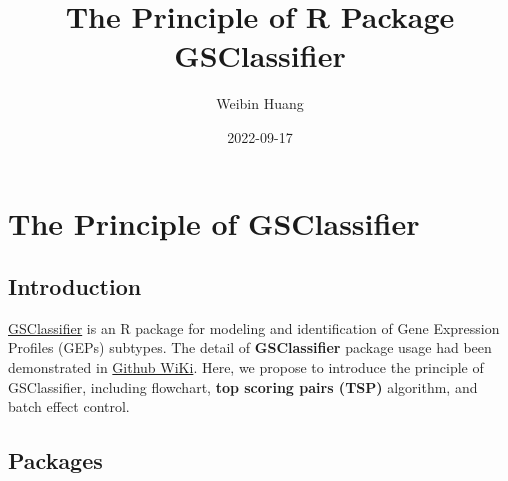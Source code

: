 \documentclass[
  12pt,
]{book}
\title{The Principle of R Package GSClassifier}
\author{Weibin Huang}
\date{2022-09-17}
\begin{document}
\maketitle

{
\hypersetup{linkcolor=}
\setcounter{tocdepth}{2}
\tableofcontents
}
\hypertarget{the-principle-of-gsclassifier}{%
\chapter{The Principle of GSClassifier}\label{the-principle-of-gsclassifier}}

\hypertarget{introduction}{%
\section{Introduction}\label{introduction}}

\href{https://github.com/huangwb8/GSClassifier}{GSClassifier} is an R package for modeling and identification of Gene Expression Profiles (GEPs) subtypes. The detail of \textbf{GSClassifier} package usage had been demonstrated in \href{https://github.com/huangwb8/GSClassifier/wiki}{Github WiKi}. Here, we propose to introduce the principle of GSClassifier, including flowchart, \textbf{top scoring pairs (TSP)} algorithm, and batch effect control.

\hypertarget{packages}{%
\section{Packages}\label{packages}}
\end{document}
